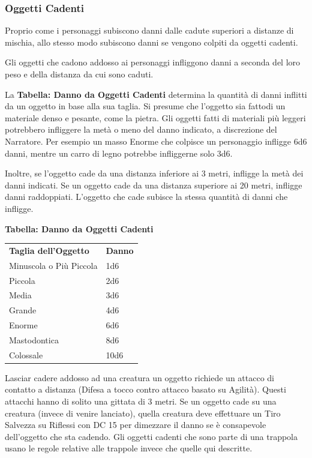 \documentclass[a4paper,11pt,twoside,openany]{book}
\begin{document}
\subsubsection{Oggetti Cadenti}

\label{oggetti-cadenti}

Proprio come i personaggi subiscono danni dalle cadute superiori a distanze di mischia, allo stesso modo subiscono danni se vengono colpiti da oggetti cadenti.

Gli oggetti che cadono addosso ai personaggi infliggono danni a seconda del loro peso e della distanza da cui sono caduti.

La \textbf{Tabella: Danno da Oggetti Cadenti} determina la quantità di danni inflitti da un oggetto in base alla sua taglia. Si presume che l'oggetto sia fattodi un materiale denso e pesante, come la pietra.
Gli oggetti fatti di materiali più leggeri potrebbero infliggere la metà o meno del danno indicato, a discrezione del Narratore. Per esempio un masso Enorme che colpisce un personaggio infligge 6d6 danni, mentre un carro di legno potrebbe infliggerne solo 3d6.

Inoltre, se l'oggetto cade da una distanza inferiore ai 3 metri, infligge la metà dei danni indicati. Se un oggetto cade da una distanza superiore ai 20 metri, infligge danni raddoppiati. L'oggetto che cade subisce la stessa quantità di danni che infligge.

\bigskip

\textbf{Tabella: Danno da Oggetti Cadenti}

\begin{tabular}{ll}
	\toprule
	\textbf{Taglia dell'Oggetto} & \textbf{Danno}\\
	Minuscola o Più Piccola      & 1d6\\
	Piccola                      & 2d6\\
	Media                        & 3d6\\
	Grande                       & 4d6\\
	Enorme                       & 6d6\\
	Mastodontica                 & 8d6\\
	Colossale                    & 10d6\\
\end{tabular}

\bigskip

Lasciar cadere addosso ad una creatura un oggetto richiede un attacco di contatto a distanza (Difesa a tocco contro attacco basato su Agilità). Questi attacchi hanno di solito una gittata di 3 metri. Se un oggetto cade su una creatura (invece di venire lanciato), quella creatura deve effettuare un Tiro Salvezza su Riflessi con DC 15 per dimezzare il danno se è consapevole dell'oggetto che sta cadendo. Gli oggetti cadenti che sono parte di una trappola usano le regole relative alle trappole invece che quelle qui descritte.
\end{document}
